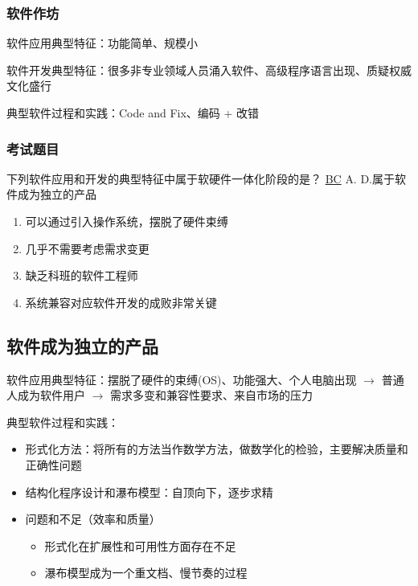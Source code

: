 \subsubsection{软件作坊}
软件应用典型特征：功能简单、规模小

软件开发典型特征：很多非专业领域人员涌入软件、高级程序语言出现、质疑权威文化盛行

典型软件过程和实践：Code and Fix、编码 + 改错

\subsubsection{考试题目}
\begin{problem}
	下列软件应用和开发的典型特征中属于软硬件一体化阶段的是？
	\uline{BC}   {\kaishu A. D.属于软件成为独立的产品}
    \vspace{-0.8em}
    \begin{multicols}{2}
        \begin{enumerate}[label=\Alph*.]
            \item 可以通过引入操作系统，摆脱了硬件束缚
            \item 几乎不需要考虑需求变更
            \item 缺乏科班的软件工程师
            \item 系统兼容对应软件开发的成败非常关键
        \end{enumerate}
    \end{multicols}
    \vspace{-1em}
\end{problem}


\subsection{软件成为独立的产品}
软件应用典型特征：摆脱了硬件的束缚(OS)、功能强大、个人电脑出现 $\rightarrow$ 普通人成为软件用户 $\rightarrow$ 需求多变和兼容性要求、来自市场的压力

典型软件过程和实践：
\begin{itemize}
    \item 形式化方法：将所有的方法当作数学方法，做数学化的检验，主要解决质量和正确性问题
    \item 结构化程序设计和瀑布模型：自顶向下，逐步求精
    \item 问题和不足（效率和质量）
    \vspace{-0.8em}
    \begin{multicols}{2}
        \begin{itemize}
            \item 形式化在扩展性和可用性方面存在不足
            \item 瀑布模型成为一个重文档、慢节奏的过程
        \end{itemize}
    \end{multicols}
    \vspace{-1em}
\end{itemize}


